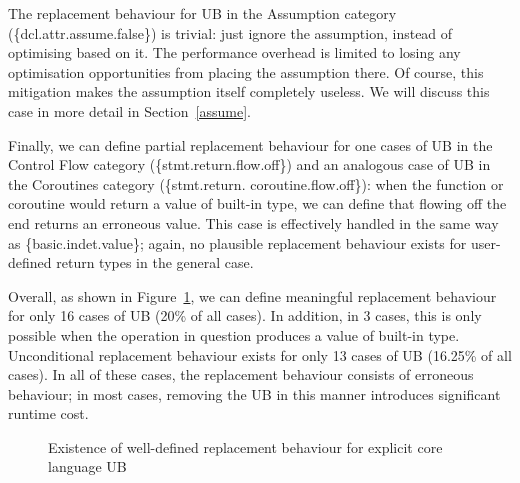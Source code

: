 {The replacement behaviour for UB in the Assumption category (\{dcl.attr.assume.false\}) is trivial: just ignore the assumption, instead of optimising based on it. The performance overhead is limited to losing any optimisation opportunities from placing the assumption there. Of course, this mitigation makes the assumption itself completely useless. We will discuss this case in more detail in Section~\ref{assume}.

Finally, we can define partial replacement behaviour for one cases of UB in the Control Flow category  (\{stmt.return.flow.off\}) and an analogous case of UB in the Coroutines category (\{stmt.return.
coroutine.flow.off\}): when the function or coroutine would return a value of built-in type, we can define that flowing off the end returns an erroneous value. This case is effectively handled in the same way as \{basic.indet.value\}; again, no plausible replacement behaviour exists for user-defined return types in the general case.

Overall, as shown in Figure~\ref{piechart_replacement}, we can define meaningful replacement behaviour for only 16 cases of UB (20\% of all cases). In addition, in 3 cases, this is only possible when the operation in question produces a value of built-in type. Unconditional replacement behaviour exists for only 13 cases of UB (16.25\% of all cases). In all of these cases, the replacement behaviour consists of erroneous behaviour; in most cases, removing the UB in this manner introduces significant runtime cost.


\vspace{5mm} %
\begin{figure}[t!]
    \centering
    \caption{Existence of well-defined replacement behaviour for explicit core language UB}
    \label{piechart_replacement}
\end{figure}


}
